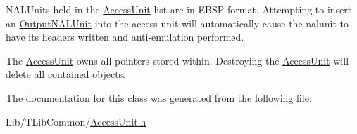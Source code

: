 N\+A\+L\+Units held in the \hyperlink{class_access_unit}{Access\+Unit} list are in E\+B\+SP format. Attempting to insert an \hyperlink{struct_output_n_a_l_unit}{Output\+N\+A\+L\+Unit} into the access unit will automatically cause the nalunit to have its headers written and anti-\/emulation performed.

The \hyperlink{class_access_unit}{Access\+Unit} owns all pointers stored within. Destroying the \hyperlink{class_access_unit}{Access\+Unit} will delete all contained objects. 

The documentation for this class was generated from the following file\+:\begin{DoxyCompactItemize}
\item 
Lib/\+T\+Lib\+Common/\hyperlink{_access_unit_8h}{Access\+Unit.\+h}\end{DoxyCompactItemize}
